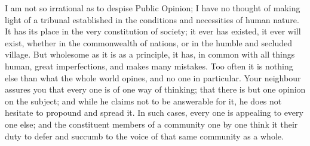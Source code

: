 I am not so irrational as to despise Public Opinion; I have no
thought of making light of a tribunal established in the conditions
and necessities of human nature. It has its place in the very
constitution of society; it ever has existed, it ever will exist,
whether in the commonwealth of nations, or in the humble and secluded
village. But wholesome as it is as a principle, it has, in common with
all things human, great imperfections, and makes many mistakes. Too
often it is nothing else than what the whole world opines, and no one
in particular. Your neighbour assures you that every one is of one way
of thinking; that there is but one opinion on the subject; and while
he claims not to be answerable for it, he does not hesitate to
propound and spread it. In such cases, every one is appealing to every
one else; and the constituent members of a community one by one think
it their duty to defer and succumb to the voice of that same community
as a whole.

